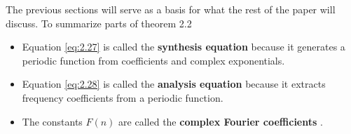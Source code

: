 \documentclass[10pt]{article}
\begin{document}
The previous sections will serve as a basis for what the rest of the paper will discuss. To summarize parts of theorem 2.2
\begin{itemize}
    \item Equation \eqref{eq:2.27} is called the \textbf{synthesis equation} because it generates a periodic function from coefficients and complex exponentials.
    \item Equation \eqref{eq:2.28} is called the \textbf{analysis equation} because it extracts frequency coefficients from a periodic function.
    \item The constants $F(n)$ are called the \textbf{complex Fourier coefficients} \cite{morrison1994fourier}.
\end{itemize}


\end{document}
